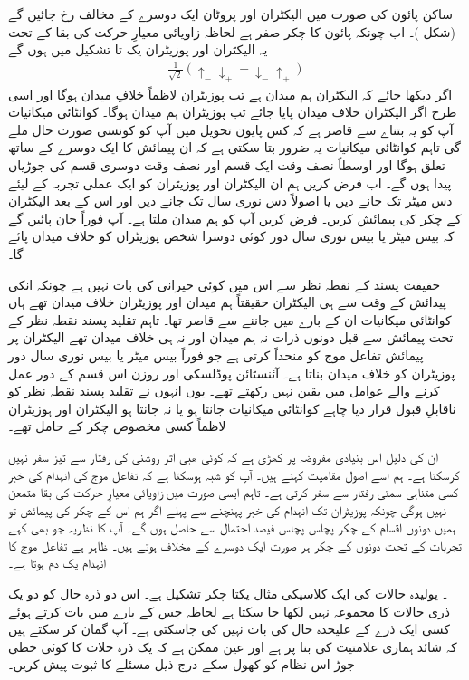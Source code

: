 ساکن پائون کی صورت میں الیکٹران اور پروٹان ایک دوسرے کے مخالف رخ جائیں گے (شکل )۔ اب چونکہ پائون کا چکر صفر ہے لحاظہ زاویائی معیارِ حرکت کی بقا کے تحت یہ الیکٹران اور پوزیٹران یک تا تشکیل  میں ہوں گے
\begin{align}
	\frac{1}{\sqrt{2}}(\uparrow_{-}\downarrow_{+}-\downarrow_{-}\uparrow_{+})
\end{align}
اگر دیکھا جائے کہ الیکٹران ہم میدان ہے تب پوزیٹران لاظماً خلافِ میدان ہوگا اور اسی طرح اگر الیکٹران خلاف میدان پایا جائے تب پوزیٹران ہم میدان ہوگا۔ کوانٹائی میکانیات آپ کو یہ بتناے سے قاصر ہے کہ کس پایون تحویل میں آپ کو کونسی صورت حال ملے گی تاہم کوانٹائی میکانیات یہ ضرور بتا سکتی ہے کہ ان پیمائش کا ایک دوسرے کے ساتھ تعلق ہوگا اور اوسطاً نصف وقت ایک قسم اور نصف وقت دوسری قسم کی جوڑیاں پیدا ہوں گے۔ اب فرض کریں ہم ان الیکٹران اور پوزیٹران کو ایک عملی تجربہ کے لیئے دس میٹر تک جانے دیں یا اصولاً دس نوری سال تک جانے دیں اور اس کے بعد الیکٹران کے چکر کی پیمائش کریں۔ فرض کریں آپ کو ہم میدان ملتا ہے۔ آپ فوراً جان پائیں گے کہ بیس میٹر یا بیس نوری سال دور کوئی دوسرا شخص پوزیٹران کو خلاف میدان پائے گا۔

حقیقت پسند کے نقطہ نظر سے اس میں کوئی حیرانی کی بات نہیں ہے چونکہ انکی پیدائش کے وقت سے ہی الیکٹران حقیقتاً ہم میدان اور پوزیٹران خلاف میدان تھے ہاں کوانٹائی میکانیات ان کے بارے میں جاننے سے قاصر تھا۔ تاہم تقلید پسند نقطہ نظر کے تحت پیمائش سے قبل دونوں ذرات نہ ہم میدان اور نہ ہی خلاف میدان تھے الیکٹران پر پیمائش تفاعل موج کو منحداً کرتی ہے جو فوراً بیس میٹر یا بیس نوری سال دور پوزیٹران کو خلاف میدان بناتا ہے۔ آئنسٹائن پوڈلسکی اور روزن اس قسم کے دور عمل کرنے والے عوامل میں یقین نہیں رکھتے تھے۔ یوں انہوں نے تقلید پسند نقطہ نظر کو ناقابلِ قبول قرار دیا چاہے کوانٹائی میکانیات جانتا ہو یا نہ جانتا ہو الیکٹران اور ہوزیٹران لاظماً کسی مخصوص چکر کے حامل تھے۔

ان کی دلیل اس بنیادی مفروضہ پر کھڑی ہے کہ کوئی ھبی اثر روشنی کی رفتار سے تیز سفر نہیں کرسکتا ہے۔ ہم اسے اصول مقامیت کہتے ہیں۔ آپ کو شبہ ہوسکتا ہے کہ تفاعل موج کی انہدام کی خبر کسی متناہی سمتی رفتار سے سفر کرتی ہے۔ تاہم ایسی صورت میں زاویائی معیارِ حرکت کی بقا متمعن نہیں ہوگی چونکہ پوزیٹران تک انہدام کی خبر پہنچنے سے پہلے اگر ہم اس کے چکر کی پیمائش تو ہمیں دونوں اقسام کے چکر پچاس پچاس فیصد احتمال سے حاصل ہوں گے۔ آپ کا نظریہ جو بھی کہے تجربات کے تحت دونوں کے چکر ہر صورت ایک دوسرے کے مخلاف ہوتے ہیں۔ ظاہر ہے تفاعل موج کا انہدام یک دم ہوتا ہے۔

۔ یولیدہ حالات کی ایک کلاسیکی مثال یکتا چکر تشکیل   ہے۔ اس دو ذرہ حال کو دو یک ذری حالات کا مجموعہ نہیں لکھا جا سکتا ہے لحاظہ جس کے بارے میں بات کرتے ہوئے کسی ایک ذرے کے علیحدہ حال کی بات نہیں کی جاسکتی ہے۔ آپ گمان کر سکتے ہیں کہ شائد ہماری علامتیت کی بنا پر ہے اور عین ممکن ہے کہ یک ذرہ حلات کا کوئی خطی جوڑ اس نظام کو کھول سکے درج ذیل مسئلے کا ثبوت پیش کریں۔

